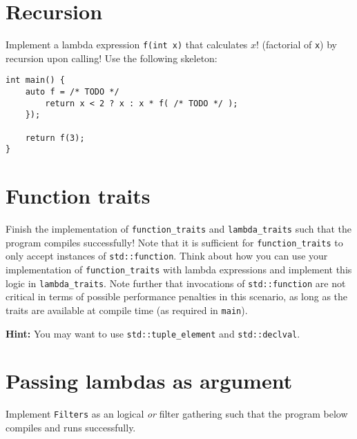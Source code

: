 \section{Recursion}
Implement a lambda expression \texttt{f(int x)} that calculates $x!$ (factorial of \texttt{x}) by recursion upon calling!
Use the following skeleton:
\begin{lstlisting}
int main() {
    auto f = /* TODO */
        return x < 2 ? x : x * f( /* TODO */ );
    });

    return f(3);
}
\end{lstlisting}

\section{Function traits}
\label{sec:fcttraits}
Finish the implementation of \texttt{function\_traits} and \texttt{lambda\_traits} such that the program compiles successfully! Note that it is sufficient for \texttt{function\_traits} to only accept instances of \texttt{std::function}. Think about how you can use your implementation of \texttt{function\_traits} with lambda expressions and implement this logic in \texttt{lambda\_traits}. Note further that invocations of \texttt{std::function} are not critical in terms of possible performance penalties in this scenario, as long as the traits are available at compile time (as required in \texttt{main}).


\textbf{Hint:} You may want to use \texttt{std::tuple\_element} and \texttt{std::declval}.

\newpage

\section{Passing lambdas as argument}
Implement \texttt{Filters} as an logical \textit{or} filter gathering such that the program below compiles and runs successfully.


